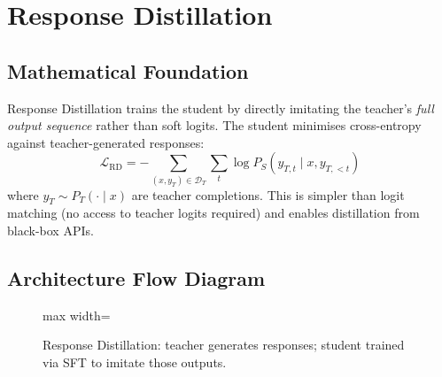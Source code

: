 \newpage
\section{Response Distillation}

\subsection{Mathematical Foundation}
Response Distillation trains the student by directly imitating the teacher's \emph{full output sequence} rather than soft logits. The student minimises cross-entropy against teacher-generated responses:
\begin{equation}
  \mathcal{L}_{\text{RD}} = -\sum_{(x,y_T) \in \mathcal{D}_T} \sum_t \log P_S(y_{T,t} \mid x, y_{T,<t})
\end{equation}
where $y_T \sim P_T(\cdot \mid x)$ are teacher completions. This is simpler than logit matching (no access to teacher logits required) and enables distillation from black-box APIs.

\subsection{Architecture Flow Diagram}

\begin{figure}[h]
\centering
\begin{adjustbox}{max width=\linewidth}
\end{adjustbox}
\caption{Response Distillation: teacher generates responses; student trained via SFT to imitate those outputs.}
\end{figure}

